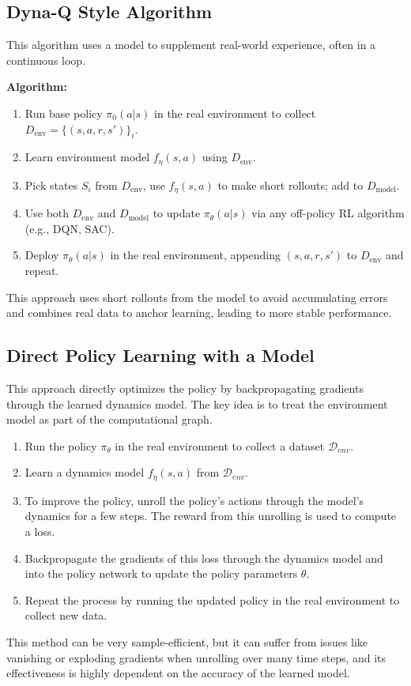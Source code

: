 \documentclass[12pt]{article}
\begin{document}
\subsection{Dyna-Q Style Algorithm}
This algorithm uses a model to supplement real-world experience, often in a continuous loop.

\item \textbf{Algorithm:}
\begin{enumerate}
    \item Run base policy $\pi_0(a|s)$ in the real environment to collect $D_{\text{env}} = \{(s,a,r,s')\}_i$.
    \item Learn environment model $f_\eta(s,a)$ using $D_{\text{env}}$.
    \item Pick states $S_i$ from $D_{\text{env}}$, use $f_\eta(s,a)$ to make short rollouts; add to $D_{\text{model}}$.
    \item Use both $D_{\text{env}}$ and $D_{\text{model}}$ to update $\pi_\theta(a|s)$ via any off-policy RL algorithm (e.g., DQN, SAC).
    \item Deploy $\pi_\theta(a|s)$ in the real environment, appending $(s,a,r,s')$ to $D_{\text{env}}$ and repeat.
\end{enumerate}

This approach uses short rollouts from the model to avoid accumulating errors and combines real data to anchor learning, leading to more stable performance.

\subsection{Direct Policy Learning with a Model }
This approach directly optimizes the policy by backpropagating gradients through the learned dynamics model. The key idea is to treat the environment model as part of the computational graph.
\begin{enumerate}
    \item Run the policy $\pi_\theta$ in the real environment to collect a dataset $\mathcal{D}_{env}$.
    \item Learn a dynamics model $f_\eta(s,a)$ from $\mathcal{D}_{env}$.
    \item To improve the policy, unroll the policy's actions through the model's dynamics for a few steps. The reward from this unrolling is used to compute a loss.
    \item Backpropagate the gradients of this loss through the dynamics model and into the policy network to update the policy parameters $\theta$.
    \item Repeat the process by running the updated policy in the real environment to collect new data.
\end{enumerate}
This method can be very sample-efficient, but it can suffer from issues like vanishing or exploding gradients when unrolling over many time steps, and its effectiveness is highly dependent on the accuracy of the learned model.
\end{document}
